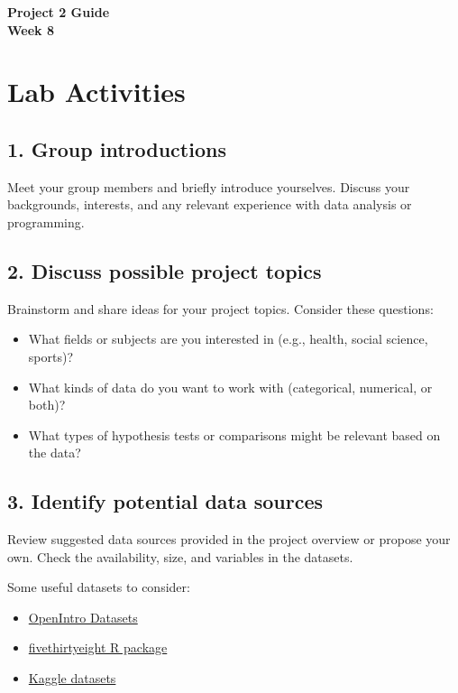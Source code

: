 \documentclass[12pt]{article}
\begin{document}
\begin{center}
\textbf{\Large Project 2 Guide \\ Week 8 } 
\end{center}

\section*{Lab Activities}

\subsection*{1. Group introductions}
Meet your group members and briefly introduce yourselves.  
Discuss your backgrounds, interests, and any relevant experience with data analysis or programming.

\vspace{4\baselineskip}

\subsection*{2. Discuss possible project topics}
Brainstorm and share ideas for your project topics. Consider these questions:  
\begin{itemize}
    \item What fields or subjects are you interested in (e.g., health, social science, sports)?  
    \item What kinds of data do you want to work with (categorical, numerical, or both)?  
    \item What types of hypothesis tests or comparisons might be relevant based on the data?  
\end{itemize}

\vspace{2\baselineskip}

\subsection*{3. Identify potential data sources}
Review suggested data sources provided in the project overview or propose your own.  
Check the availability, size, and variables in the datasets.

\vspace{1\baselineskip}

\noindent Some useful datasets to consider:  
\begin{itemize}
    \item \href{https://www.openintro.org/data/}{OpenIntro Datasets}  
    \item \href{https://cran.r-project.org/web/packages/fivethirtyeight/vignettes/fivethirtyeight.html}{fivethirtyeight R package}  
    \item \href{https://www.kaggle.com/datasets}{Kaggle datasets}  
\end{itemize}
\end{document}
